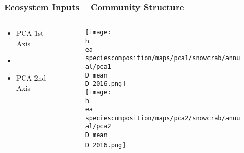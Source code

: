 \documentclass{beamer}
\numberwithin{equation}{section}		%
\numberwithin{figure}{section}	   	%
\numberwithin{table}{section}				%
\newcommand{\D}{.}  %
\newcommand{\h}{C:/} %
\newcommand{\ea}{bio.data/aegis/}
\begin{document}
\begin{frame}
\frametitle{Ecosystem Inputs -- Community Structure}

	\begin{columns}
	\begin{column}{0.2\textwidth}
	\begin{center}
	\begin{itemize}
	  \setlength\itemsep{2em}
		\item[] PCA 1st Axis 
		\item[]
		\item[] PCA 2nd Axis
	\end{itemize}
	\end{center}
	\end{column}

	\begin{column}{0.7\textwidth}
 	\begin{figure}
   		\texttt{[image: \\h \\ea speciescomposition/maps/pca1/snowcrab/annual/pca1\\D mean\\D 2016.png]}\\
  		\texttt{[image: \\h \\ea speciescomposition/maps/pca2/snowcrab/annual/pca2\\D mean\\D 2016.png]}\
  	\end{figure}
  	\end{column}

  	\end{columns}
\end{frame}
\end{document}
